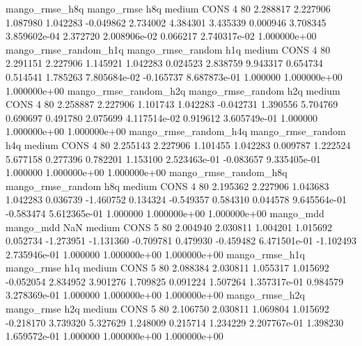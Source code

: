        mango_rmse_h8q        mango_rmse                  h8q     medium     CONS                 4 80  2.288817       2.227906 1.087980       1.042283   -0.049862      2.734002      4.384301     3.435339       0.000946  3.708345 3.859602e-04     2.372720   2.008906e-02            0.066217    2.740317e-02        1.000000e+00
mango_rmse_random_h1q mango_rmse_random                  h1q     medium     CONS                 4 80  2.291151       2.227906 1.145921       1.042283    0.024523      2.838759      9.943317     0.654734       0.514541  1.785263 7.805684e-02    -0.165737   8.687873e-01            1.000000    1.000000e+00        1.000000e+00
mango_rmse_random_h2q mango_rmse_random                  h2q     medium     CONS                 4 80  2.258887       2.227906 1.101743       1.042283   -0.042731      1.390556      5.704769     0.690697       0.491780  2.075699 4.117514e-02     0.919612   3.605749e-01            1.000000    1.000000e+00        1.000000e+00
mango_rmse_random_h4q mango_rmse_random                  h4q     medium     CONS                 4 80  2.255143       2.227906 1.101455       1.042283    0.009787      1.222524      5.677158     0.277396       0.782201  1.153100 2.523463e-01    -0.083657   9.335405e-01            1.000000    1.000000e+00        1.000000e+00
mango_rmse_random_h8q mango_rmse_random                  h8q     medium     CONS                 4 80  2.195362       2.227906 1.043683       1.042283    0.036739     -1.460752      0.134324    -0.549357       0.584310  0.044578 9.645564e-01    -0.583474   5.612365e-01            1.000000    1.000000e+00        1.000000e+00
            mango_mdd         mango_mdd                  NaN     medium     CONS                 5 80  2.004940       2.030811 1.004201       1.015692    0.052734     -1.273951     -1.131360    -0.709781       0.479930 -0.459482 6.471501e-01    -1.102493   2.735946e-01            1.000000    1.000000e+00        1.000000e+00
       mango_rmse_h1q        mango_rmse                  h1q     medium     CONS                 5 80  2.088384       2.030811 1.055317       1.015692   -0.052054      2.834952      3.901276     1.709825       0.091224  1.507264 1.357317e-01     0.984579   3.278369e-01            1.000000    1.000000e+00        1.000000e+00
       mango_rmse_h2q        mango_rmse                  h2q     medium     CONS                 5 80  2.106750       2.030811 1.069804       1.015692   -0.218170      3.739320      5.327629     1.248009       0.215714  1.234229 2.207767e-01     1.398230   1.659572e-01            1.000000    1.000000e+00        1.000000e+00
